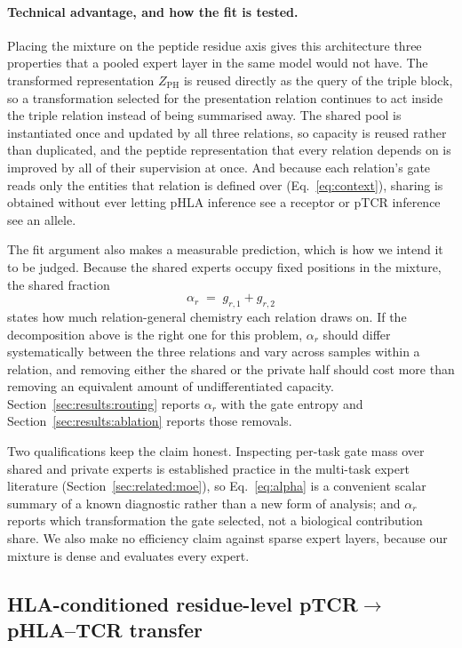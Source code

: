 \documentclass[webpdf,modern,large,namedate]{oup-authoring-template}
\theoremstyle{thmstyleone}
\theoremstyle{thmstyletwo}
\theoremstyle{thmstylethree}
\newcommand{\PH}{pHLA}
\newcommand{\PT}{pTCR}
\newcommand{\PHT}{pHLA--TCR}
\newcommand{\PHm}{\mathrm{PH}}
\begin{document}
\paragraph{Technical advantage, and how the fit is tested.}
Placing the mixture on the peptide residue axis gives this architecture three
properties that a pooled expert layer in the same model would not have. The
transformed representation $Z_{\PHm}$ is reused directly as the query of the
triple block, so a transformation selected for the presentation relation
continues to act inside the triple relation instead of being summarised away.
The shared pool is instantiated once and updated by all three relations, so
capacity is reused rather than duplicated, and the peptide representation that
every relation depends on is improved by all of their supervision at once.
And because each relation's gate reads only the entities that relation is
defined over (Eq.~\eqref{eq:context}), sharing is obtained without ever
letting \PH{} inference see a receptor or \PT{} inference see an allele.

The fit argument also makes a measurable prediction, which is how we intend it
to be judged. Because the shared experts occupy fixed positions in the
mixture, the shared fraction
\begin{equation}
\alpha_r \;=\; g_{r,1}+g_{r,2}
\label{eq:alpha}
\end{equation}
states how much relation-general chemistry each relation draws on. If the
decomposition above is the right one for this problem, $\alpha_r$ should
differ systematically between the three relations and vary across samples
within a relation, and removing either the shared or the private half should
cost more than removing an equivalent amount of undifferentiated capacity.
Section~\ref{sec:results:routing} reports $\alpha_r$ with the gate entropy and
Section~\ref{sec:results:ablation} reports those removals.

Two qualifications keep the claim honest. Inspecting per-task gate mass over
shared and private experts is established practice in the multi-task expert
literature (Section~\ref{sec:related:moe}), so Eq.~\eqref{eq:alpha} is a
convenient scalar summary of a known diagnostic rather than a new form of
analysis; and $\alpha_r$ reports which transformation the gate selected, not a
biological contribution share. We also make no efficiency claim against sparse
expert layers, because our mixture is dense and evaluates every expert.

\subsection{HLA-conditioned residue-level \PT{}$\rightarrow$\PHT{}
transfer}\label{sec:method:fusion}
\end{document}
